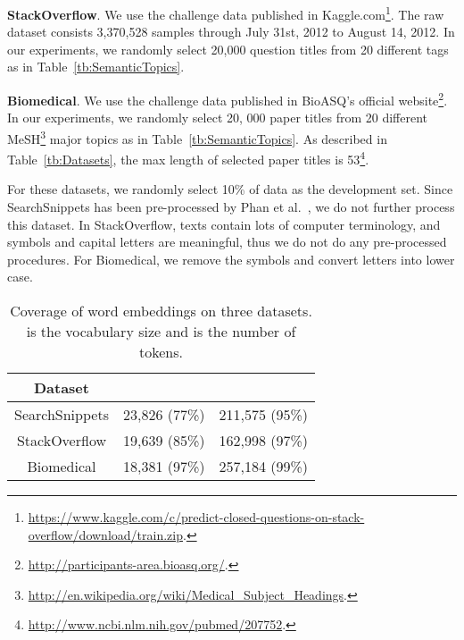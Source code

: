 \documentclass[review]{elsarticle}
\begin{document}
{\bf{StackOverflow}}. We use the challenge data published in Kaggle.com\footnote{\url{https://www.kaggle.com/c/predict-closed-questions-on-stack-overflow/download/train.zip}.}. The raw dataset consists 3,370,528 samples through July 31st, 2012 to August 14, 2012. In our experiments, we randomly select 20,000 question titles from 20 different tags as in Table~\ref{tb:SemanticTopics}.

{\bf{Biomedical}}. We use the challenge data published in BioASQ's official website\footnote{\url{http://participants-area.bioasq.org/}.}. In our experiments, we randomly select 20, 000 paper titles from 20 different MeSH\footnote{\url{http://en.wikipedia.org/wiki/Medical_Subject_Headings}.} major topics as in Table~\ref{tb:SemanticTopics}. As described in Table~\ref{tb:Datasets}, the max length of selected paper titles is 53\footnote{\url{http://www.ncbi.nlm.nih.gov/pubmed/207752}.}.

For these datasets, we randomly select 10\% of data as the development set. Since SearchSnippets has been pre-processed by Phan et al.~\cite{20_phan2008learning}, we do not further process this dataset. In StackOverflow, texts contain lots of computer terminology, and symbols and capital letters are meaningful, thus we do not do any pre-processed procedures. For Biomedical, we remove the symbols and convert letters into lower case.



\begin{table}[t] \begin{center}
\begin{tabular}{|c|c|c|}\hline
      Dataset           &	  &	       \\\hline \hline
SearchSnippets&23,826 (77\%) &	211,575 (95\%)\\
StackOverflow&	19,639 (85\%)  &	162,998 (97\%) \\
Biomedical&18,381 (97\%) & 257,184 (99\%)\\\hline
\end{tabular}
\end{center}
\caption{\label{tb:Embeddings} Coverage of word embeddings on three datasets.  is the vocabulary size and  is the number of tokens.}
\end{table}
\end{document}
